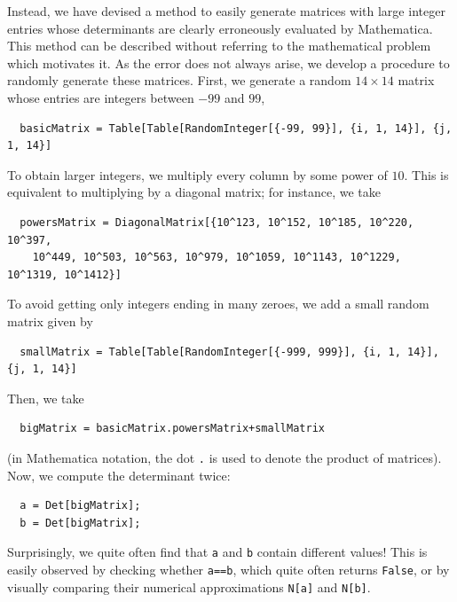 \documentclass[12pt]{article}
\begin{document}
Instead, we have devised a method to easily generate matrices with large integer entries whose determinants are clearly erroneously evaluated by Mathematica. This method can be described without referring to the mathematical problem which motivates it. As the error does not always arise, we develop a procedure to randomly generate these matrices.
First, we generate a random $14\times14$ matrix whose entries are integers between $-99$ and $99$,
\begin{verbatim}
  basicMatrix = Table[Table[RandomInteger[{-99, 99}], {i, 1, 14}], {j, 1, 14}]
\end{verbatim}
To obtain larger integers, we multiply every column by some power of $10$. This is equivalent to multiplying by a diagonal matrix; for instance, we take
\begin{verbatim}
  powersMatrix = DiagonalMatrix[{10^123, 10^152, 10^185, 10^220, 10^397,
    10^449, 10^503, 10^563, 10^979, 10^1059, 10^1143, 10^1229, 10^1319, 10^1412}]
\end{verbatim}
To avoid getting only integers ending in many zeroes, we add a small random matrix given by
\begin{verbatim}
  smallMatrix = Table[Table[RandomInteger[{-999, 999}], {i, 1, 14}], {j, 1, 14}]
\end{verbatim}
Then, we take
\begin{verbatim}
  bigMatrix = basicMatrix.powersMatrix+smallMatrix
\end{verbatim}
(in Mathematica notation, the dot \texttt{.} is used to denote the product of matrices). Now, we compute the determinant twice:
\begin{verbatim}
  a = Det[bigMatrix];
  b = Det[bigMatrix];
\end{verbatim}
Surprisingly, we quite often find that \texttt{a} and \texttt{b} contain different values! This is easily observed by checking whether \texttt{a==b}, which quite often returns \texttt{False}, or by visually comparing their numerical approximations \texttt{N[a]} and \texttt{N[b]}.
\end{document}
